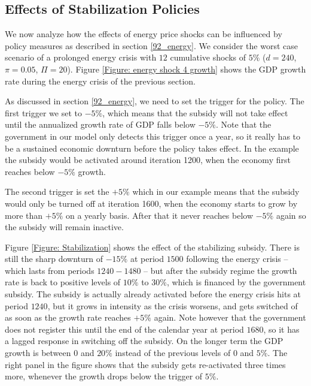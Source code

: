 
\subsection{Effects of Stabilization Policies}
We now analyze how the effects of energy price shocks can be influenced by policy measures as described in section \ref{92_energy}.
We consider the worst case scenario of a prolonged energy crisis with $12$ cumulative shocks of $5\%$ ($d=240$, $\pi=0.05$, $\Pi=20$).
Figure \ref{Figure: energy shock 4 growth} shows the GDP growth rate during the energy crisis of the previous section. 

As discussed in section \ref{92_energy}, we need to set the trigger for the policy.
The first trigger we set to $-5\%$, which means that the subsidy will not take effect until the annualized growth rate of GDP falls below $-5\%$. Note that the government in our model only detects this trigger once a year, so it really has to be a sustained economic downturn before the policy takes effect. In the example the subsidy would be activated around iteration 1200, when the economy first reaches below $-5\%$ growth.

The second trigger is set the $+5\%$ which in our example means that the subsidy would only be turned off at iteration 1600, when the economy starts to grow by more than $+5\%$ on a yearly basis. After that it never reaches below $-5\%$ again so the subsidy will remain inactive.

Figure \ref{Figure: Stabilization} shows the effect of the stabilizing subsidy. 
There is still the sharp downturn of $-15\%$ at period $1500$ following the energy crisis -- which lasts from periods $1240-1480$ -- but after the subsidy regime the growth rate is back to positive levels of $10\%$ to $30\%$, which is financed by the government subsidy. The subsidy is actually already activated before the energy crisis hits at period $1240$, but it grows in intensity as the crisis worsens, and gets switched of as soon as the growth rate reaches $+5\%$ again. Note however that the government does not register this until the end of the calendar year at period $1680$, so it has a lagged response in switching off the subsidy. On the longer term the GDP growth is between $0$ and $20\%$ instead of the previous levels of $0$ and $5\%$. The right panel in the figure shows that the subsidy gets re-activated three times more, whenever the growth drops below the trigger of $5\%$.

